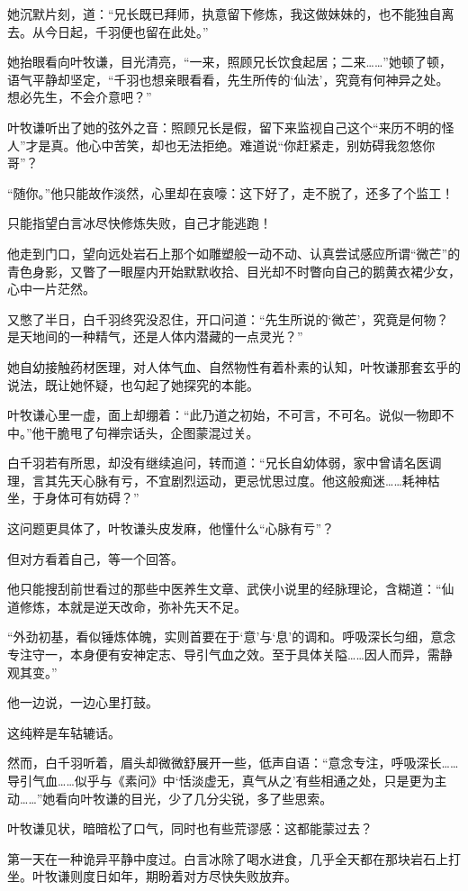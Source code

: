 她沉默片刻，道：“兄长既已拜师，执意留下修炼，我这做妹妹的，也不能独自离去。从今日起，千羽便也留在此处。”

她抬眼看向叶牧谦，目光清亮，“一来，照顾兄长饮食起居；二来……”她顿了顿，语气平静却坚定，“千羽也想亲眼看看，先生所传的‘仙法’，究竟有何神异之处。想必先生，不会介意吧？”

叶牧谦听出了她的弦外之音：照顾兄长是假，留下来监视自己这个“来历不明的怪人”才是真。他心中苦笑，却也无法拒绝。难道说“你赶紧走，别妨碍我忽悠你哥”？

“随你。”他只能故作淡然，心里却在哀嚎：这下好了，走不脱了，还多了个监工！

只能指望白言冰尽快修炼失败，自己才能逃跑！

他走到门口，望向远处岩石上那个如雕塑般一动不动、认真尝试感应所谓“微芒”的青色身影，又瞥了一眼屋内开始默默收拾、目光却不时瞥向自己的鹅黄衣裙少女，心中一片茫然。

又憋了半日，白千羽终究没忍住，开口问道：“先生所说的‘微芒’，究竟是何物？是天地间的一种精气，还是人体内潜藏的一点灵光？”

她自幼接触药材医理，对人体气血、自然物性有着朴素的认知，叶牧谦那套玄乎的说法，既让她怀疑，也勾起了她探究的本能。

叶牧谦心里一虚，面上却绷着：“此乃道之初始，不可言，不可名。说似一物即不中。”他干脆甩了句禅宗话头，企图蒙混过关。

白千羽若有所思，却没有继续追问，转而道：“兄长自幼体弱，家中曾请名医调理，言其先天心脉有亏，不宜剧烈运动，更忌忧思过度。他这般痴迷……耗神枯坐，于身体可有妨碍？”

这问题更具体了，叶牧谦头皮发麻，他懂什么“心脉有亏”？

但对方看着自己，等一个回答。

他只能搜刮前世看过的那些中医养生文章、武侠小说里的经脉理论，含糊道：“仙道修炼，本就是逆天改命，弥补先天不足。

“外劲初基，看似锤炼体魄，实则首要在于‘意’与‘息’的调和。呼吸深长匀细，意念专注守一，本身便有安神定志、导引气血之效。至于具体关隘……因人而异，需静观其变。”

他一边说，一边心里打鼓。

这纯粹是车轱辘话。

然而，白千羽听着，眉头却微微舒展开一些，低声自语：“意念专注，呼吸深长……导引气血……似乎与《素问》中‘恬淡虚无，真气从之’有些相通之处，只是更为主动……”她看向叶牧谦的目光，少了几分尖锐，多了些思索。

叶牧谦见状，暗暗松了口气，同时也有些荒谬感：这都能蒙过去？

第一天在一种诡异平静中度过。白言冰除了喝水进食，几乎全天都在那块岩石上打坐。叶牧谦则度日如年，期盼着对方尽快失败放弃。

